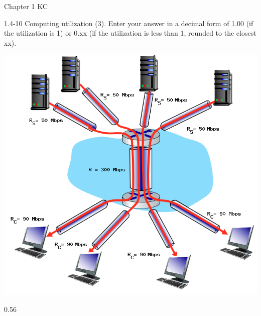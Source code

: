 \documentclass[a4paper]{article}
\begin{document}
\begin{quiz}{Chapter 1 KC}
\begin{shortanswer}[points=1]{1.4-10 Computing utilization (3).}
Enter your answer in a decimal form of 1.00 (if the utilization is 1) or 0.xx (if the utilization is less than 1, rounded to the closest xx).

\begin{center}
\includegraphics[width=\linewidth]{figs/1.4.7.png}
\end{center}
\item* 0.56
\end{shortanswer}

\end{quiz}
\end{document}
